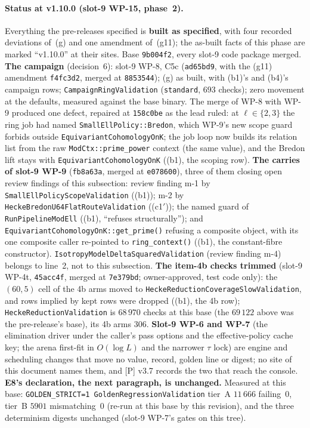 \documentclass[11pt]{article}
\theoremstyle{remark}
\begin{document}
\paragraph{Status at v1.10.0 (slot-9 WP-15, phase~2).} Everything the pre-releases specified is
\textbf{built as specified}, with four recorded deviations of~(g) and one amendment of~(g11); the
as-built facts of this phase are marked ``v1.10.0'' at their sites. Base \texttt{9b004f2}, every
slot-9 code package merged. \textbf{The campaign} (decision~6): slot-9 WP-8, C5c
(\texttt{ad65bd9}, with the (g11) amendment \texttt{f4fc3d2}, merged at \texttt{8853544}); (g)
as built, with (b1)'s and (b4)'s campaign rows; \texttt{CampaignRingValidation}
(\texttt{standard}, $693$ checks); zero movement at the defaults, measured against the base
binary. The merge of WP-8 with WP-9 produced one defect, repaired at \texttt{158c0be} as the lead
ruled: at $\ell\in\{2,3\}$ the ring job had named \texttt{SmallEllPolicy::Bredon}, which WP-9's
new scope guard forbids outside \texttt{EquivariantCohomologyOnK}; the job loop now builds its
relation list from the raw \texttt{ModCtx::prime\_power} context (the same value), and the Bredon
lift stays with \texttt{EquivariantCohomologyOnK} ((b1), the scoping row). \textbf{The carries of
slot-9 WP-9} (\texttt{fb8a63a}, merged at \texttt{e078600}), three of them closing open review
findings of this subsection: review finding m-1 by \texttt{SmallEllPolicyScopeValidation}
((b1)); m-2 by \texttt{HeckeBredonU64FlatRouteValidation} ((c1$'$)); the named guard of
\texttt{RunPipelineModEll} ((b1), ``refuses structurally''); and
\texttt{EquivariantCohomologyOnK::get\_prime()} refusing a composite object, with its one composite
caller re-pointed to \texttt{ring\_context()} ((b1), the constant-fibre constructor).
\texttt{IsotropyModelDeltaSquaredValidation} (review finding m-4) belongs to line~2, not to this
subsection. \textbf{The item-4b checks trimmed} (slot-9 WP-4t, \texttt{45acc4f}, merged at
\texttt{7e379bd}; owner-approved, test code only): the $(60,5)$ cell of the 4b arms moved to
\texttt{HeckeReductionCoverageSlowValidation}, and rows implied by kept rows were dropped
((b1), the 4b row); \texttt{HeckeReductionValidation} is $68\,970$ checks at this base (the
$69\,122$ above was the pre-release's base), its 4b arms $306$. \textbf{Slot-9 WP-6 and WP-7}
(the elimination driver under the caller's pass options and the effective-policy cache key; the
arena first-fit in $O(\log L)$ and the narrower $\tau$ lock) are engine and scheduling changes that
move no value, record, golden line or digest; no site of this document names them, and [P] v3.7
records the two that reach the console. \textbf{E8's declaration, the next paragraph, is unchanged.} Measured at
this base: \texttt{GOLDEN\_STRICT=1 GoldenRegressionValidation} tier~A $11\,666$ failing~$0$,
tier~B $5901$ mismatching~$0$ (re-run at this base by this revision), and the three
determinism digests unchanged (slot-9 WP-7's gates on this tree).
\end{document}
